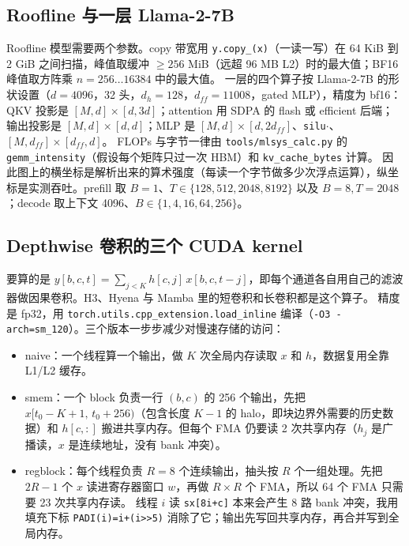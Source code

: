 \documentclass[11pt,a4paper]{ctexart}
\begin{document}
\subsection{Roofline 与一层 Llama-2-7B}
Roofline 模型\cite{roofline}需要两个参数。copy 带宽用 \texttt{y.copy\_(x)}（一读一写）在 64 KiB 到 2 GiB 之间扫描，峰值取缓冲 $\ge256$ MiB（远超 96 MB L2）时的最大值；BF16 峰值取方阵乘 $n=256\ldots16384$ 中的最大值。
一层的四个算子按 Llama-2-7B\cite{llama2} 的形状设置（$d=4096$，32 头，$d_h=128$，$d_{ff}=11008$，gated MLP），精度为 bf16：
QKV 投影是 $[M,d]\times[d,3d]$；attention 用 SDPA 的 flash 或 efficient 后端；输出投影是 $[M,d]\times[d,d]$；MLP 是 $[M,d]\times[d,2d_{ff}]$、\texttt{silu}$\cdot$、$[M,d_{ff}]\times[d_{ff},d]$。
FLOPs 与字节一律由 \texttt{tools/mlsys\_calc.py} 的 \texttt{gemm\_intensity}（假设每个矩阵只过一次 HBM）和 \texttt{kv\_cache\_bytes} 计算。
因此图上的横坐标是解析出来的算术强度（每读一个字节做多少次浮点运算），纵坐标是实测吞吐。prefill 取 $B=1$、$T\in\{128,512,2048,8192\}$ 以及 $B=8,T=2048$；decode 取上下文 4096、$B\in\{1,4,16,64,256\}$。

\subsection{Depthwise 卷积的三个 CUDA kernel}\label{sec:impl-conv}

要算的是 $y[b,c,t]=\sum_{j<K}h[c,j]\,x[b,c,t-j]$，即每个通道各自用自己的滤波器做因果卷积。H3、Hyena\cite{h3,hyena} 与 Mamba\cite{mamba} 里的短卷积和长卷积都是这个算子。
精度是 fp32，用 \texttt{torch.utils.cpp\_extension.load\_inline} 编译（\texttt{-O3 -arch=sm\_120}）。三个版本一步步减少对慢速存储的访问：
\begin{itemize}
\item naive：一个线程算一个输出，做 $K$ 次全局内存读取 $x$ 和 $h$，数据复用全靠 L1/L2 缓存。
\item smem：一个 block 负责一行 $(b,c)$ 的 256 个输出，先把 $x[t_0-K+1,\,t_0+256)$（包含长度 $K-1$ 的 halo，即块边界外需要的历史数据）和 $h[c,:]$ 搬进共享内存。但每个 FMA 仍要读 2 次共享内存（$h_j$ 是广播读，$x$ 是连续地址，没有 bank 冲突）。
\item regblock：每个线程负责 $R=8$ 个连续输出，抽头按 $R$ 个一组处理。先把 $2R-1$ 个 $x$ 读进寄存器窗口 $w$，再做 $R\times R$ 个 FMA，所以 64 个 FMA 只需要 23 次共享内存读。
  线程 $i$ 读 \texttt{sx[8i+c]} 本来会产生 8 路 bank 冲突，我用填充下标 \texttt{PADI(i)=i+(i>>5)} 消除了它；输出先写回共享内存，再合并写到全局内存。
\end{itemize}
\end{document}
